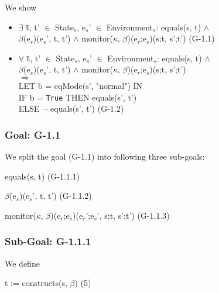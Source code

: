 \documentclass[conference]{IEEEtran}
\begin{document}
\noindent We show
\begin{itemize}
\item \begin{tabbing}$\exists$ \=t, t' $\in$ State$_s$, e$_s$' $\in$ Environment$_s$: equals(s, t) $\wedge$ 
\\\>\textlbrackdbl $\beta$\textrbrackdbl(e$_s$)(e$_s$', t, t') $\wedge$ monitor($\kappa$, $\beta$)(e$_r$;e$_s$)(s;t, s';t')  \hspace*{0.3cm} (G-1.1)\end{tabbing}
\item \begin{tabbing}$\forall$ \=t, t' $\in$ State$_s$, e$_s$' $\in$ Environment$_s$: equals(s, t) $\wedge$ 
\\\>\textlbrackdbl $\beta$\textrbrackdbl(e$_s$)(e$_s$', t, t') $\wedge$ monitor($\kappa$, $\beta$)(e$_r$;e$_s$)(s;t, s';t')
\\\>$\Rightarrow$ \=
\\\> LET \=b = eqMode(s', "normal") IN
\\\>\>IF b = \texttt{True} THEN equals(s', t') 
\\\>\> ELSE $\neg$ equals(s', t')   \hspace*{2cm} (G-1.2) \end{tabbing}
 \end{itemize}
 
 \subsubsection*{Goal: G-1.1}

\noindent We split the goal (G-1.1) into following three sub-goals:

equals(s, t)  \hspace*{4.2cm}(G-1.1.1)


\textlbrackdbl $\beta$\textrbrackdbl(e$_s$)(e$_s$', t, t')  \hspace*{3.3cm}(G-1.1.2)


monitor($\kappa$, $\beta$)(e$_r$;e$_s$)(e$_r$';e$_s$', s;t, s';t')  \hspace*{0.4cm}(G-1.1.3)


\subsubsection*{Sub-Goal: G-1.1.1}

\noindent We define

\begin{center}
t := constructs(s, $\beta$)  \hspace*{3cm} (5)
\end{center}
\end{document}
